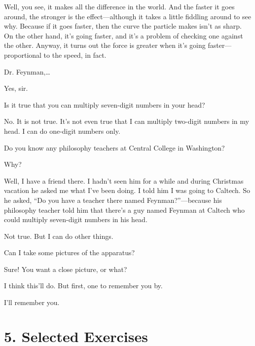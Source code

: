 \documentclass[11pt,oneside]{article}
\begin{document}
Well, you see, it makes all the difference in the world. And the faster it goes around, the stronger is the effect---although it takes a little fiddling around to see why. Because if it goes faster, then the curve the particle makes isn't as sharp. On the other hand, it's going faster, and it's a problem of checking one against the other. Anyway, it turns out the force is greater when it's going faster---proportional to the speed, in fact.\par

Dr. Feynman,\ldots{}\par

Yes, sir.\par

Is it true that you can multiply seven-digit numbers in your head?\par

No. It is not true. It's not even true that I can multiply two-digit numbers in my head. I can do one-digit numbers only.\par

Do you know any philosophy teachers at Central College in Washington?\par

Why?\par

Well, I have a friend there. I hadn't seen him for a while and during Christmas vacation he asked me what I've been doing. I told him I was going to Caltech. So he asked, ``Do you have a teacher there named Feynman?''---because his philosophy teacher told him that there's a guy named Feynman at Caltech who could multiply seven-digit numbers in his head.\par

Not true. But I can do other things.\par

Can I take some pictures of the apparatus?\par

Sure! You want a close picture, or what?\par

I think this'll do. But first, one to remember you by.\par

I'll remember you.\par

\clearpage


\section*{5. Selected Exercises}
\end{document}
